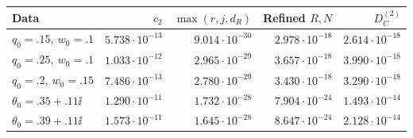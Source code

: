 \begin{tabular}{lrrrr}
\toprule
Data & $c_2$ & $\max(r,j,d_R)$ & Refined $R,N$ & $D_C^{(2)}$\\
\midrule
$q_0=.15,\ w_0=.1$ & $5.738\cdot10^{-13}$ & $9.014\cdot10^{-30}$ & $2.978\cdot10^{-18}$ & $2.614\cdot10^{-18}$\\
$q_0=.25,\ w_0=.1$ & $1.033\cdot10^{-12}$ & $2.965\cdot10^{-29}$ & $3.657\cdot10^{-18}$ & $3.990\cdot10^{-18}$\\
$q_0=.2,\ w_0=.15$ & $7.486\cdot10^{-13}$ & $2.780\cdot10^{-29}$ & $3.430\cdot10^{-18}$ & $3.290\cdot10^{-18}$\\
$\theta_0=.35+.11\ii$ & $1.290\cdot10^{-11}$ & $1.732\cdot10^{-28}$ & $7.904\cdot10^{-24}$ & $1.493\cdot10^{-14}$\\
$\theta_0=.39+.11\ii$ & $1.573\cdot10^{-11}$ & $1.645\cdot10^{-28}$ & $8.647\cdot10^{-24}$ & $2.128\cdot10^{-14}$\\
\bottomrule
\end{tabular}
